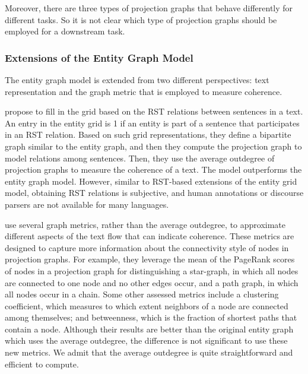 Moreover, there are three types of projection graphs that behave differently for different tasks. 
So it is not clear which type of projection graphs should be employed for a downstream task. 

\subsubsection{Extensions of the Entity Graph Model}

The entity graph model is extended from two different perspectives: text representation and the graph metric that is employed to measure coherence. 

 propose to fill in the grid based on the RST relations between sentences in a text. 
An entry in the entity grid is 1 if an entity is part of a sentence that participates in an RST relation.
Based on such grid representations, they define a bipartite graph similar to the entity graph, and then they compute the projection graph to model relations among sentences. 
Then, they use the average outdegree of projection graphs to measure the coherence of a text. 
The model outperforms the entity graph model. 
However, similar to RST-based extensions of the entity grid model, obtaining RST relations is subjective, and human annotations or discourse parsers are not available for many languages. 

 use several graph metrics, rather than the average outdegree, to approximate different aspects of the text flow that can indicate coherence.  
These metrics are designed to capture more information about the connectivity style of nodes in projection graphs. 
For example, they leverage the mean of the PageRank scores \cite{newmanmark10} of nodes in a projection graph for distinguishing a star-graph, in which all nodes are connected to one node and no other edges occur, and a path graph, in which all nodes occur in a chain. 
Some other assessed metrics include a clustering coefficient, which measures to which extent neighbors of a node are connected among themselves; and betweenness, which is the fraction of shortest paths that contain a node. 
Although their results are better than the original entity graph which uses the average outdegree, the difference is not significant to use these new metrics. 
We admit that the average outdegree is quite straightforward and efficient to compute. 

